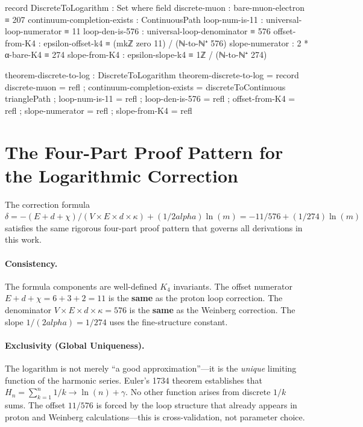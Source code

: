 \documentclass[11pt,a4paper]{book}
\def\alpha{alpha}%
\begin{document}
\begin{code}
record DiscreteToLogarithm : Set where
  field
    discrete-muon : bare-muon-electron ≡ 207
    continuum-completion-exists : ContinuousPath
    loop-num-is-11 : universal-loop-numerator ≡ 11
    loop-den-is-576 : universal-loop-denominator ≡ 576
    offset-from-K4 : epsilon-offset-k4 ≡ (mkℤ zero 11) / (ℕ-to-ℕ⁺ 576)
    slope-numerator : 2 * α-bare-K4 ≡ 274
    slope-from-K4 : epsilon-slope-k4 ≡ 1ℤ / (ℕ-to-ℕ⁺ 274)

theorem-discrete-to-log : DiscreteToLogarithm
theorem-discrete-to-log = record
  { discrete-muon = refl
  ; continuum-completion-exists = discreteToContinuous trianglePath
  ; loop-num-is-11 = refl
  ; loop-den-is-576 = refl
  ; offset-from-K4 = refl
  ; slope-numerator = refl
  ; slope-from-K4 = refl
  }
\end{code}

\section{The Four-Part Proof Pattern for the Logarithmic Correction}

The correction formula $\delta = -(E + d + \chi)/(V \times E \times d \times \kappa) + (1/2\alpha)\ln(m) = -11/576 + (1/274)\ln(m)$ satisfies the same rigorous four-part proof pattern that governs all derivations in this work.

\paragraph{Consistency.} The formula components are well-defined $K_4$ invariants. The offset numerator $E + d + \chi = 6 + 3 + 2 = 11$ is the \textbf{same} as the proton loop correction. The denominator $V \times E \times d \times \kappa = 576$ is the \textbf{same} as the Weinberg correction. The slope $1/(2\alpha) = 1/274$ uses the fine-structure constant.

\paragraph{Exclusivity (Global Uniqueness).} The logarithm is not merely ``a good approximation''---it is the \emph{unique} limiting function of the harmonic series. Euler's 1734 theorem establishes that $H_n = \sum_{k=1}^n 1/k \to \ln(n) + \gamma$. No other function arises from discrete $1/k$ sums. The offset $11/576$ is forced by the loop structure that already appears in proton and Weinberg calculations---this is cross-validation, not parameter choice.
\end{document}
